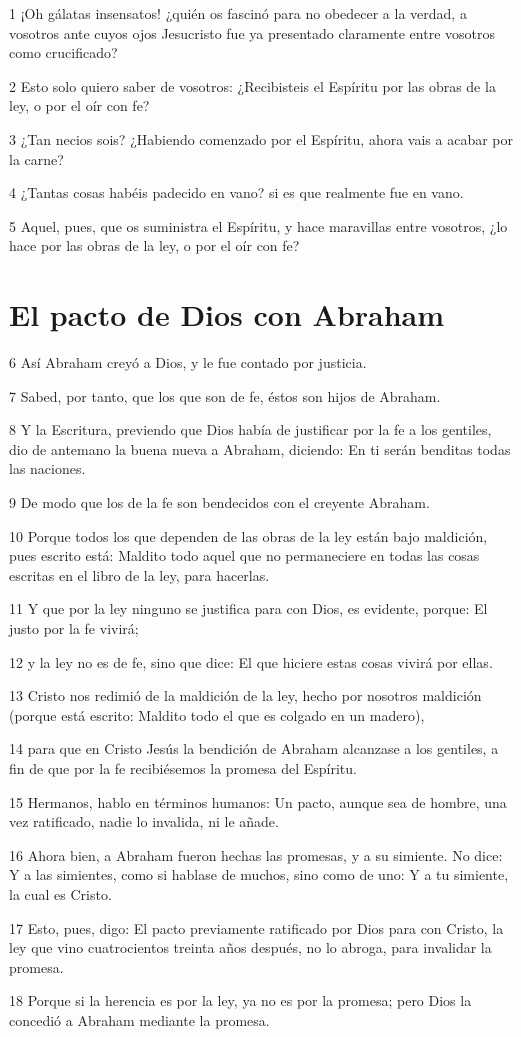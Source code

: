 \par 1 ¡Oh gálatas insensatos! ¿quién os fascinó para no obedecer a la verdad, a vosotros ante cuyos ojos Jesucristo fue ya presentado claramente entre vosotros como crucificado?
\par 2 Esto solo quiero saber de vosotros: ¿Recibisteis el Espíritu por las obras de la ley, o por el oír con fe?
\par 3 ¿Tan necios sois? ¿Habiendo comenzado por el Espíritu, ahora vais a acabar por la carne?
\par 4 ¿Tantas cosas habéis padecido en vano? si es que realmente fue en vano.
\par 5 Aquel, pues, que os suministra el Espíritu, y hace maravillas entre vosotros, ¿lo hace por las obras de la ley, o por el oír con fe?

\section*{El pacto de Dios con Abraham}

\par 6 Así Abraham creyó a Dios, y le fue contado por justicia.
\par 7 Sabed, por tanto, que los que son de fe, éstos son hijos de Abraham.
\par 8 Y la Escritura, previendo que Dios había de justificar por la fe a los gentiles, dio de antemano la buena nueva a Abraham, diciendo: En ti serán benditas todas las naciones.
\par 9 De modo que los de la fe son bendecidos con el creyente Abraham.
\par 10 Porque todos los que dependen de las obras de la ley están bajo maldición, pues escrito está: Maldito todo aquel que no permaneciere en todas las cosas escritas en el libro de la ley, para hacerlas.
\par 11 Y que por la ley ninguno se justifica para con Dios, es evidente, porque: El justo por la fe vivirá;
\par 12 y la ley no es de fe, sino que dice: El que hiciere estas cosas vivirá por ellas.
\par 13 Cristo nos redimió de la maldición de la ley, hecho por nosotros maldición (porque está escrito: Maldito todo el que es colgado en un madero),
\par 14 para que en Cristo Jesús la bendición de Abraham alcanzase a los gentiles, a fin de que por la fe recibiésemos la promesa del Espíritu.
\par 15 Hermanos, hablo en términos humanos: Un pacto, aunque sea de hombre, una vez ratificado, nadie lo invalida, ni le añade.
\par 16 Ahora bien, a Abraham fueron hechas las promesas, y a su simiente. No dice: Y a las simientes, como si hablase de muchos, sino como de uno: Y a tu simiente, la cual es Cristo.
\par 17 Esto, pues, digo: El pacto previamente ratificado por Dios para con Cristo, la ley que vino cuatrocientos treinta años después, no lo abroga, para invalidar la promesa.
\par 18 Porque si la herencia es por la ley, ya no es por la promesa; pero Dios la concedió a Abraham mediante la promesa.


